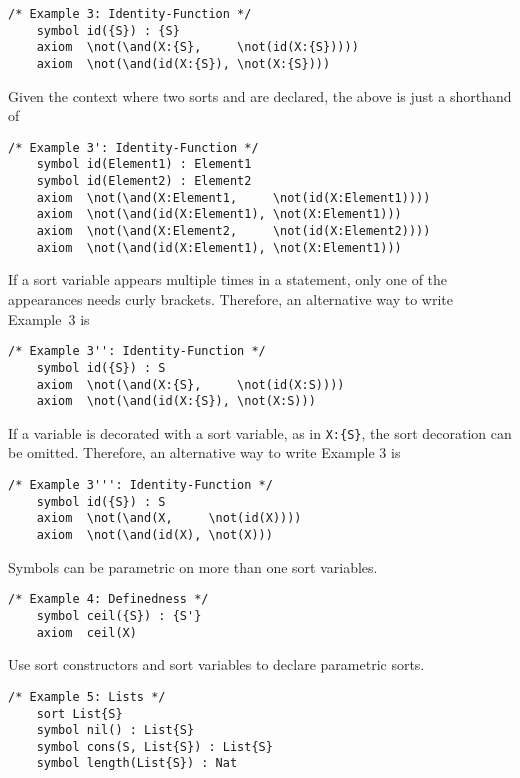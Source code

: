 \documentclass[UTF8]{article}
\theoremstyle{plain}
\theoremstyle{definition}
\theoremstyle{remark}
\begin{document}
\begin{Verbatim}[fontsize=\small]
    /* Example 3: Identity-Function */
    symbol id({S}) : {S}
    axiom  \not(\and(X:{S},     \not(id(X:{S}))))
    axiom  \not(\and(id(X:{S}), \not(X:{S})))
\end{Verbatim}

Given the context where two sorts  and  are declared, the above is just a shorthand of

\begin{Verbatim}[fontsize=\small]
    /* Example 3': Identity-Function */
    symbol id(Element1) : Element1
    symbol id(Element2) : Element2
    axiom  \not(\and(X:Element1,     \not(id(X:Element1))))
    axiom  \not(\and(id(X:Element1), \not(X:Element1)))
    axiom  \not(\and(X:Element2,     \not(id(X:Element2))))
    axiom  \not(\and(id(X:Element1), \not(X:Element1)))
\end{Verbatim}

If a sort variable appears multiple times in a statement, only one of the appearances needs curly brackets.
Therefore, an alternative way to write Example~3 is
\begin{Verbatim}[fontsize=\small]
    /* Example 3'': Identity-Function */
    symbol id({S}) : S
    axiom  \not(\and(X:{S},     \not(id(X:S))))
    axiom  \not(\and(id(X:{S}), \not(X:S)))
\end{Verbatim}

If a variable is decorated with a sort variable, as in {\small\verb|X:{S}|}, the sort decoration can be omitted. Therefore, an alternative way to write Example 3 is
\begin{Verbatim}[fontsize=\small]
    /* Example 3''': Identity-Function */
    symbol id({S}) : S
    axiom  \not(\and(X,     \not(id(X))))
    axiom  \not(\and(id(X), \not(X)))
\end{Verbatim}

Symbols can be parametric on more than one sort variables.
\begin{Verbatim}[fontsize=\small]
    /* Example 4: Definedness */
    symbol ceil({S}) : {S'}
    axiom  ceil(X)
\end{Verbatim}

Use sort constructors and sort variables to declare parametric sorts.
\begin{Verbatim}[fontsize=\small]
    /* Example 5: Lists */
    sort List{S}
    symbol nil() : List{S}
    symbol cons(S, List{S}) : List{S}
    symbol length(List{S}) : Nat
\end{Verbatim}
\end{document}
